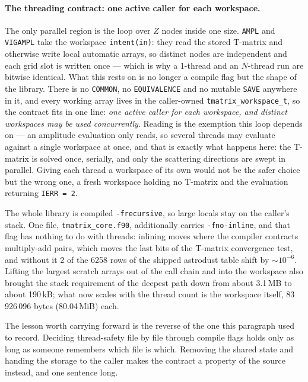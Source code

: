\documentclass{my_memo}
\newcommand{\code}[1]{\texttt{#1}}
\begin{document}
\paragraph{The threading contract: one active caller for each workspace.} The
only parallel region is the loop over $Z$ nodes inside one size. \code{AMPL} and
\code{VIGAMPL} take the workspace \code{intent(in)}: they read the stored T-matrix
and otherwise write local automatic arrays, so distinct nodes are independent and
each grid slot is written once --- which is why a 1-thread and an $N$-thread run
are bitwise identical. What this rests on is no longer a compile flag but the
shape of the library. There is no \code{COMMON}, no \code{EQUIVALENCE} and no
mutable \code{SAVE} anywhere in it, and every working array lives in the
caller-owned \code{tmatrix\_workspace\_t}, so the contract fits in one line:
\emph{one active caller for each workspace, and distinct workspaces may be used
concurrently}. Reading is the exemption this loop depends on --- an amplitude
evaluation only reads, so several threads may evaluate against a single workspace
at once, and that is exactly what happens here: the T-matrix is solved once,
serially, and only the scattering directions are swept in parallel. Giving each
thread a workspace of its own would not be the safer choice but the wrong one, a
fresh workspace holding no T-matrix and the evaluation returning \code{IERR = 2}.

The whole library is compiled \code{-frecursive}, so large locals stay on the
caller's stack. One file, \code{tmatrix\_core.f90}, additionally carries
\code{-fno-inline}, and that flag has nothing to do with threads: inlining moves
where the compiler contracts multiply-add pairs, which moves the last bits of the
T-matrix convergence test, and without it 2 of the 6258 rows of the shipped
astrodust table shift by ${\sim}10^{-6}$. Lifting the largest scratch arrays out
of the call chain and into the workspace also brought the stack requirement of the
deepest path down from about 3.1\,MB to about 190\,kB; what now scales with the
thread count is the workspace itself, 83\,926\,096 bytes (80.04\,MiB) each.

The lesson worth carrying forward is the reverse of the one this paragraph used to
record. Deciding thread-safety file by file through compile flags holds only as
long as someone remembers which file is which. Removing the shared state and
handing the storage to the caller makes the contract a property of the source
instead, and one sentence long.
\end{document}
